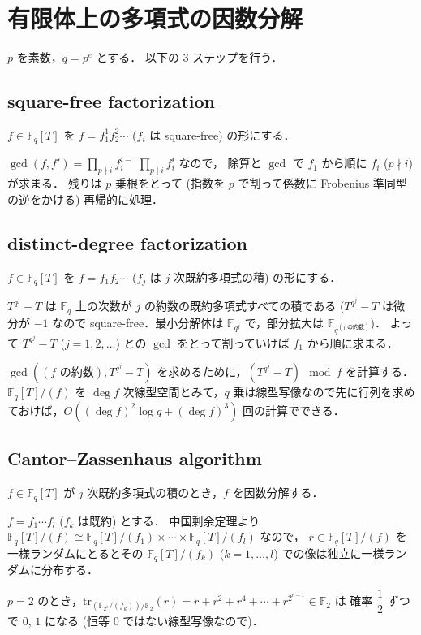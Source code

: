 \documentclass{jsarticle}
\newcommand{\F}{\mathbb{F}}
\newcommand{\tr}{\mathrm{tr}}
\begin{document}
\section{有限体上の多項式の因数分解}
$p$ を素数，$q = p^e$ とする．
以下の $3$ ステップを行う．

\subsection{square-free factorization}
$f \in \F_q[T]$ を $f = f_1^1 f_2^2 \cdots$ ($f_i$ は square-free) の形にする．

$\gcd(f, f') = \displaystyle\prod_{p \nmid i} f_i^{i-1} \displaystyle\prod_{p \mid i} f_i^i$ なので，
除算と $\gcd$ で $f_1$ から順に $f_i$ ($p \nmid i$) が求まる．
残りは $p$ 乗根をとって (指数を $p$ で割って係数に Frobenius 準同型の逆をかける) 再帰的に処理．

\subsection{distinct-degree factorization}
$f \in \F_q[T]$ を $f = f_1 f_2 \cdots$ ($f_j$ は $j$ 次既約多項式の積) の形にする．

$T^{q^j} - T$ は $\F_q$ 上の次数が $j$ の約数の既約多項式すべての積である ($T^{q^j} - T$ は微分が $-1$ なので square-free．最小分解体は $\F_{q^j}$ で，部分拡大は $\F_{q^{(\text{$j$ の約数})}}$)．
よって $T^{q^j} - T$ ($j = 1, 2, \ldots$) との $\gcd$ をとって割っていけば $f_1$ から順に求まる．

$\gcd((\text{$f$ の約数}), T^{q^j} - T)$ を求めるために，$(T^{q^j} - T) \mod f$ を計算する．
$\F_q[T] / (f)$ を $\deg f$ 次線型空間とみて，$q$ 乗は線型写像なので先に行列を求めておけば，$O((\deg f)^2 \log q + (\deg f)^3)$ 回の計算でできる．

\subsection{Cantor--Zassenhaus algorithm}
$f \in \F_q[T]$ が $j$ 次既約多項式の積のとき，$f$ を因数分解する．

$f = f_1 \cdots f_l$ ($f_k$ は既約) とする．
中国剰余定理より $\F_q[T] / (f) \cong \F_q[T] / (f_1) \times \cdots \times \F_q[T] / (f_l)$ なので，
$r \in \F_q[T] / (f)$ を一様ランダムにとるとその $\F_q[T] / (f_k)$ ($k = 1, \ldots, l$) での像は独立に一様ランダムに分布する．

$p = 2$ のとき，$\tr_{(\F_{2^e}/(f_k)) / \F_2}(r) = r + r^2 + r^4 + \cdots + r^{2^{e-1}} \in \F_2$ は
確率 $\dfrac{1}{2}$ ずつで $0$, $1$ になる (恒等 $0$ ではない線型写像なので)．
\end{document}
